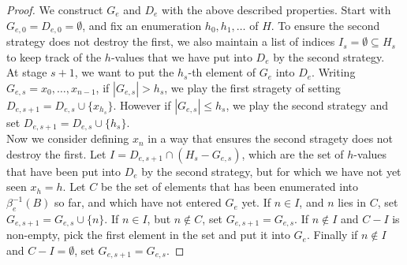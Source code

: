 \begin{proof}
  We construct $G_e$ and $D_e$ with the above described properties. Start
  with $G_{e,0}=D_{e,0}=\emptyset$, and fix an enumeration $h_0,h_1,\ldots$
  of $H$. To ensure the second strategy does not destroy the first, we also
  maintain a list of indices $I_s=\emptyset\subseteq H_s$ to keep track of
  the $h$-values that we have put into $D_e$ by the second strategy.\\

  At stage $s+1$, we want to put the $h_s$-th element of $G_e$ into $D_e$.
  Writing $G_{e,s}=x_0,\ldots,x_{n-1}$, if $|G_{e,s}|>h_s$, we play the
  first stragety of setting $D_{e,s+1} =D_{e,s} \cup \{x_{h_s}\}$.  However
  if $|G_{e,s}|\leq h_s$, we play the second strategy and set $D_{e,s+1}
  =D_{e,s} \cup \{h_s\}$.\\

  Now we consider defining $x_{n}$ in a way that ensures the second
  stragety does not destroy the first. Let $I=D_{e,s+1} \cap
  (H_s-G_{e,s})$, which are the set of $h$-values that have been put into
  $D_e$ by the second strategy, but for which we have not yet seen $x_h=h$.
  Let $C$ be the set of elements that has been enumerated into
  $\beta_e^{-1}(B)$ so far, and which have not entered $G_e$ yet. If $n\in
  I$, and $n$ lies in $C$, set $G_{e,s+1}=G_{e,s}\cup\{n\}$. If $n\in I$,
  but $n\not\in C$, set $G_{e,s+1}=G_{e,s}$. If $n\not\in I$ and $C-I$ is
  non-empty, pick the first element in the set and put it into $G_e$.
  Finally if $n\not\in I$ and $C-I=\emptyset$, set $G_{e,s+1}=G_{e,s}$.
\end{proof}
